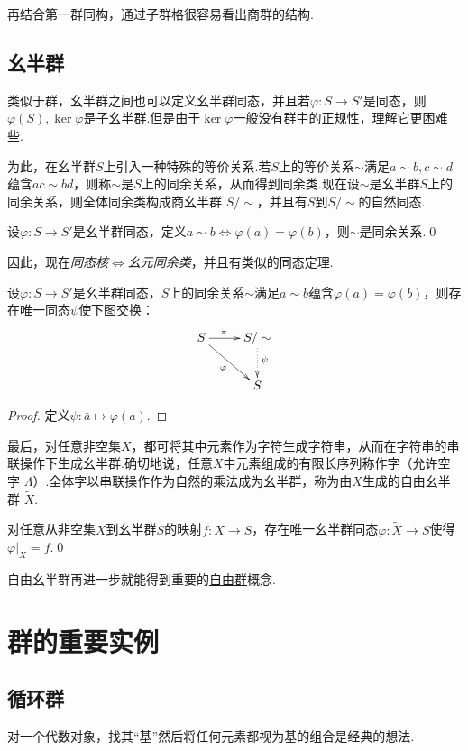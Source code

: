 再结合第一群同构，通过子群格很容易看出商群的结构.

\subsection{幺半群}
类似于群，幺半群之间也可以定义{\heiti 幺半群同态}，并且若$\varphi\colon S\to S'$是同态，则$\varphi(S),\ker\varphi$是子幺半群.但是由于$\ker\varphi$一般没有群中的正规性，理解它更困难些.

为此，在幺半群$S$上引入一种特殊的等价关系.若$S$上的等价关系$\sim$满足$a\sim b,c\sim d$蕴含$ac\sim bd$，则称$\sim$是$S$上的{\heiti 同余关系}，从而得到{\heiti 同余类}.现在设$\sim$是幺半群$S$上的同余关系，则全体同余类构成{\heiti 商幺半群} $S/\sim$，并且有$S$到$S/\sim$的{\heiti 自然同态}.
\begin{lemma}
	设$\varphi\colon S\to S'$是幺半群同态，定义$a\sim b\Leftrightarrow\varphi(a)=\varphi(b)$，则$\sim$是同余关系.\qed
\end{lemma}

因此，现在\emph{同态核$\Leftrightarrow$幺元同余类}，并且有类似的同态定理.
\begin{thm}
	设$\varphi\colon S\to S'$是幺半群同态，$S$上的同余关系$\sim$满足$a\sim b$蕴含$\varphi(a)=\varphi(b)$，则存在唯一同态$\psi$使下图交换：
	\[
		\xymatrix{
			S\ar[r]^(0.4)\pi\ar[rd]_\varphi&S/\sim\ar@{.>}[d]^(0.45)\psi\\
			&S
		}
	\]\hypertarget{thm:MonoidHomo}{}
\end{thm}
\begin{proof}
	定义$\psi\colon \bar a\mapsto\varphi(a)$.
\end{proof}

最后，对任意非空集$X$，都可将其中元素作为字符生成字符串，从而在字符串的串联操作下生成幺半群.确切地说，任意$X$中元素组成的有限长序列称作{\heiti 字}（允许{\heiti 空字} $\Lambda$）.全体字以串联操作作为自然的乘法成为幺半群，称为由$X$生成的{\heiti 自由幺半群} $\widetilde{X}$.
\begin{prop}
	对任意从非空集$X$到幺半群$S$的映射$f\colon X\to S$，存在唯一幺半群同态$\varphi\colon\widetilde{X}\to S$使得$\varphi|_X=f$.\qed\hypertarget{prop:MonoidExtension}{}
\end{prop}

自由幺半群再进一步就能得到重要的\hyperref[section:FreeGroup]{自由群}概念.
\section{群的重要实例}
\subsection{循环群}\label{subsec:cyclic}
对一个代数对象，找其“基”然后将任何元素都视为基的组合是经典的想法.

